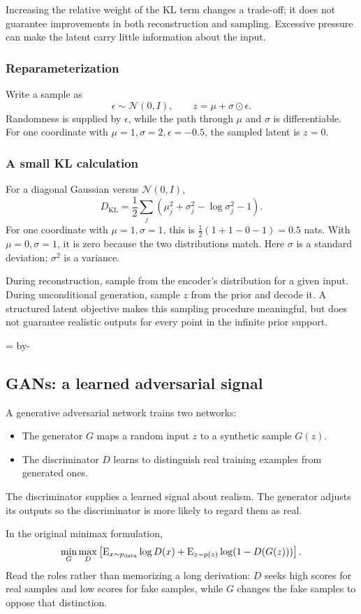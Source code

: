 \documentclass[11pt]{article}
\newcommand{\newsubsection}[1]{\par\begingroup\skip0=\pagegoal\advance\skip0 by-\pagetotal\ifdim\skip0<12\baselineskip\newpage\fi\endgroup\subsection{#1}}
\begin{document}
Increasing the relative weight of the KL term changes a trade-off; it does not guarantee improvements in both reconstruction and sampling. Excessive pressure can make the latent carry little information about the input.

\subsubsection{Reparameterization}
Write a sample as
\[
\epsilon\sim\mathcal N(0,I),\qquad z=\mu+\sigma\odot\epsilon.
\]
Randomness is supplied by $\epsilon$, while the path through $\mu$ and $\sigma$ is differentiable. For one coordinate with $\mu=1,\sigma=2,\epsilon=-0.5$, the sampled latent is $z=0$.

\subsubsection{A small KL calculation}
For a diagonal Gaussian versus $\mathcal N(0,I)$,
\[
D_{\mathrm{KL}}=\frac12\sum_j
\left(\mu_j^2+\sigma_j^2-\log\sigma_j^2-1\right).
\]
For one coordinate with $\mu=1,\sigma=1$, this is $\tfrac12(1+1-0-1)=0.5$ nats. With $\mu=0,\sigma=1$, it is zero because the two distributions match. Here $\sigma$ is a standard deviation; $\sigma^2$ is a variance.

During reconstruction, sample from the encoder's distribution for a given input. During unconditional generation, sample $z$ from the prior and decode it. A structured latent objective makes this sampling procedure meaningful, but does not guarantee realistic outputs for every point in the infinite prior support.

\newsubsection{GANs: a learned adversarial signal}
A generative adversarial network trains two networks:
\begin{itemize}
\item The generator $G$ maps a random input $z$ to a synthetic sample $G(z)$.
\item The discriminator $D$ learns to distinguish real training examples from generated ones.
\end{itemize}
The discriminator supplies a learned signal about realism. The generator adjusts its outputs so the discriminator is more likely to regard them as real.

In the original minimax formulation,
\[
\min_G\max_D\left[
\operatorname{E}_{x\sim p_{\mathrm{data}}}\log D(x)
+\operatorname{E}_{z\sim p(z)}\log(1-D(G(z)))
\right].
\]
Read the roles rather than memorizing a long derivation: $D$ seeks high scores for real samples and low scores for fake samples, while $G$ changes the fake samples to oppose that distinction.
\end{document}
